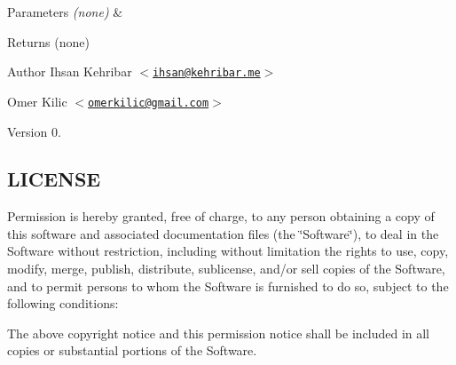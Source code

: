 \begin{DoxyParams}{\-Parameters}
{\em (none)} & \\
\hline
\end{DoxyParams}
\begin{DoxyReturn}{\-Returns}
(none)
\end{DoxyReturn}
\begin{DoxyAuthor}{\-Author}
\-Ihsan \-Kehribar $<$\href{mailto:ihsan@kehribar.me}{\tt ihsan@kehribar.\-me}$>$ 

\-Omer \-Kilic $<$\href{mailto:omerkilic@gmail.com}{\tt omerkilic@gmail.\-com}$>$ 
\end{DoxyAuthor}
\begin{DoxyVersion}{\-Version}
0.
\end{DoxyVersion}
\hypertarget{littleWire_8h_LICENSE}{}\subsection{\-L\-I\-C\-E\-N\-S\-E}\label{littleWire_8h_LICENSE}
\-Permission is hereby granted, free of charge, to any person obtaining a copy of this software and associated documentation files (the \char`\"{}\-Software\char`\"{}), to deal in the \-Software without restriction, including without limitation the rights to use, copy, modify, merge, publish, distribute, sublicense, and/or sell copies of the \-Software, and to permit persons to whom the \-Software is furnished to do so, subject to the following conditions\-:

\-The above copyright notice and this permission notice shall be included in all copies or substantial portions of the \-Software.

